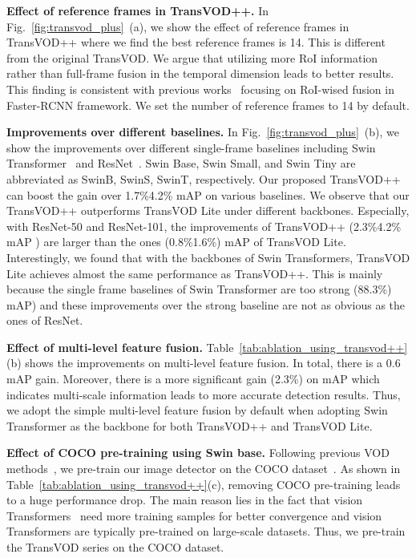 \documentclass[10pt,journal,compsoc]{IEEEtran}
\begin{document}
\noindent
\textbf{Effect of reference frames in TransVOD++.} In Fig.~\ref{fig:transvod_plus}~(a), we show the effect of reference frames in TransVOD++ where we find the best reference frames is 14. This is different from the original TransVOD. We argue that utilizing more RoI information rather than full-frame fusion in the temporal dimension leads to better results. This finding is consistent with previous works~\cite{deng19rdn,han2021cfanet,chen2020memory} focusing on RoI-wised fusion in Faster-RCNN framework. We set the number of reference frames to 14 by default.


\noindent
\textbf{Improvements over different baselines.}
In Fig.~\ref{fig:transvod_plus}~(b), we show the improvements over different single-frame baselines including Swin Transformer~\cite{liu2021swin} and ResNet~\cite{he16res}. Swin Base, Swin Small, and Swin Tiny are abbreviated as SwinB, SwinS, SwinT, respectively.
Our proposed TransVOD++ can boost the gain over 1.7\%4.2\% mAP on various baselines. We observe that our TransVOD++ outperforms TransVOD Lite under different backbones. Especially, with ResNet-50 and ResNet-101, the improvements of TransVOD++ (2.3\%4.2\% mAP ) are larger than the ones (0.8\%1.6\%) mAP  of TransVOD Lite. Interestingly, we found that with the backbones of Swin Transformers, TransVOD Lite achieves almost the same performance as TransVOD++. This is mainly because the single frame baselines of Swin Transformer are too strong (88.3\%) mAP) and these improvements over the strong baseline are not as obvious as the ones of ResNet.


\noindent
\textbf{Effect of multi-level feature fusion.} Table~\ref{tab:ablation_using_transvod++}(b) shows the improvements on multi-level feature fusion. In total, there is a 0.6 mAP gain. Moreover, there is a more significant gain (2.3\%) on mAP which indicates multi-scale information leads to more accurate detection results. Thus, we adopt the simple multi-level feature fusion by default when adopting Swin Transformer as the backbone for both TransVOD++ and TransVOD Lite.

\noindent
\textbf{Effect of COCO pre-training using Swin base.} Following previous VOD methods~\cite{yao2020video,liu2019looking,qian2020adaptive}, we pre-train our image detector on the COCO dataset~\cite{COCO_dataset}. As shown in Table~\ref{tab:ablation_using_transvod++}(c), removing COCO pre-training leads to a huge performance drop. The main reason lies in the fact that vision Transformers~\cite{dosovitskiy2020image} need more training samples for better convergence and vision Transformers are typically pre-trained on large-scale datasets. 
Thus, we pre-train the TransVOD series on the COCO dataset. 
\end{document}
